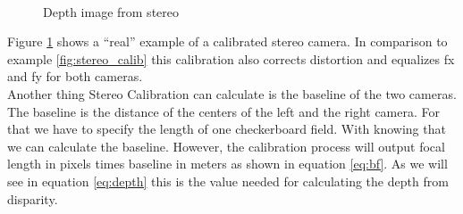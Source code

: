 \documentclass[11pt,a4paper,titlepage,oneside]{report}
\begin{document}
\begin{figure}[H]
	\centering
	\\
	\caption{Depth image from stereo}\label{fig:calibration_real}
\end{figure}

Figure \ref{fig:calibration_real} shows a ``real'' example of a calibrated stereo camera. In comparison to example \ref{fig:stereo_calib} this calibration also corrects distortion and equalizes fx and fy for both cameras.\\

Another thing Stereo Calibration can calculate is the baseline of the two cameras. The baseline is the distance of the centers of the left and the right camera. For that we have to specify the length of one checkerboard field. With knowing that we can calculate the baseline. However, the calibration process will output focal length in pixels times baseline in meters as shown in equation \ref{eq:bf}. As we will see in equation \ref{eq:depth} this is the value needed for calculating the depth from disparity.
\end{document}
